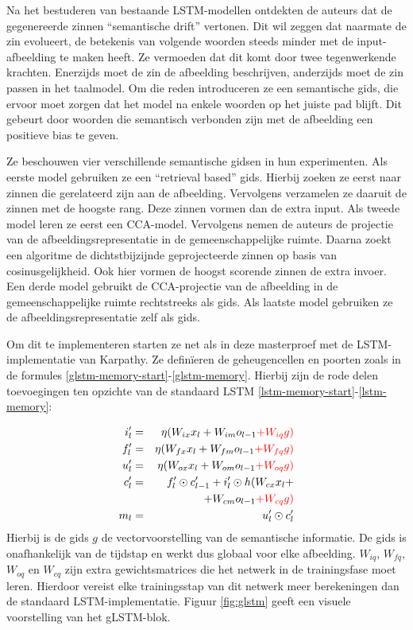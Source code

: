 Na het bestuderen van bestaande LSTM-modellen ontdekten de auteurs dat de gegenereerde zinnen ``semantische drift'' vertonen. Dit wil zeggen dat naarmate de zin evolueert, de betekenis van volgende woorden steeds minder met de input-afbeelding te maken heeft. Ze vermoeden dat dit komt door twee tegenwerkende krachten. Enerzijds moet de zin de afbeelding beschrijven, anderzijds moet de zin passen in het taalmodel. Om die reden introduceren ze een semantische gids, die ervoor moet zorgen dat het model na enkele woorden op het juiste pad blijft. Dit gebeurt door woorden die semantisch verbonden zijn met de afbeelding een positieve bias te geven.

Ze beschouwen vier verschillende semantische gidsen in hun experimenten. Als eerste model gebruiken ze een ``retrieval based'' gids. Hierbij zoeken ze eerst naar zinnen die gerelateerd zijn aan de afbeelding. Vervolgens verzamelen ze daaruit de zinnen met de hoogste rang. Deze zinnen vormen dan de extra input.
Als tweede model leren ze eerst een CCA-model. Vervolgens nemen de auteurs de projectie van de afbeeldingsrepresentatie in de gemeenschappelijke ruimte. Daarna zoekt een algoritme de dichtstbijzijnde geprojecteerde zinnen op basis van cosinusgelijkheid. Ook hier vormen de hoogst scorende zinnen de extra invoer.
Een derde model gebruikt de CCA-projectie van de afbeelding in de gemeenschappelijke ruimte rechtstreeks als gids.
Als laatste model gebruiken ze de afbeeldingsrepresentatie zelf als gids.

Om dit te implementeren starten ze net als in deze masterproef met de LSTM-implementatie van Karpathy. Ze defin\"ieren de geheugencellen en poorten zoals in de formules \eqref{glstm-memory-start}-\eqref{glstm-memory}. Hierbij zijn de rode delen toevoegingen ten opzichte van de standaard LSTM \eqref{lstm-memory-start}-\eqref{lstm-memory}:

%
\begin{eqnarray}
\vspace{-3mm}
\label{glstm-memory-start}
i_l' & = & \eta (W_{ix} x_l + W_{im} o_{l-1} \color{red}{+ W_{iq} g}) \label{glstm-input} \\
f_l' & = & \eta (W_{fx} x_l + W_{fm} o_{l-1} \color{red}{+ W_{fq} g}) \\
u_l' & = & \eta (W_{ox} x_l + W_{om} o_{l-1} \color{red}{+ W_{oq} g}) \\
c_l' & = & f_l' \odot c_{l-1}' + i_l' \odot h(W_{cx} x_l + \nonumber \\
&   & + W_{cm} o_{l-1} \color{red}{+ W_{cq} g}) \\
m_l & = & u_l' \odot c_l'
\label{glstm-memory}
\vspace{-3mm}
\end{eqnarray}
Hierbij is de gids $g$ de vectorvoorstelling van de semantische informatie. De gids is onafhankelijk van de tijdstap en werkt dus globaal voor elke afbeelding. $W_{iq}$, $W_{fq}$, $W_{oq}$ en $W_{cq}$ zijn extra gewichtsmatrices die het netwerk in de trainingsfase moet leren. Hierdoor vereist elke trainingsstap van dit netwerk meer berekeningen dan de standaard LSTM-implementatie. Figuur \ref{fig:glstm} geeft een visuele voorstelling van het gLSTM-blok.


